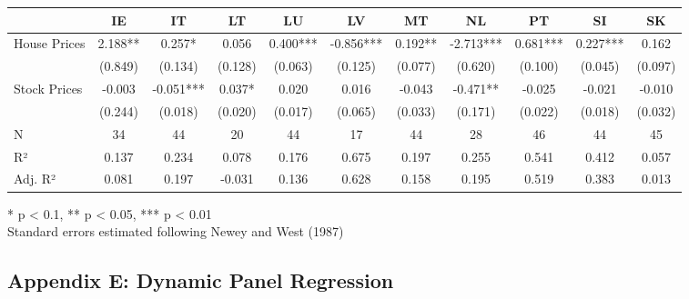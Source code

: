 \documentclass[
  a4paper,
  DIV=11,
  numbers=noendperiod]{scrartcl}
\begin{document}
\begin{landscape}
\begin{table}[h]
\fontsize{7.5pt}{9.0pt}\selectfont
\begin{tabular*}{\linewidth}{@{\extracolsep{\fill}}lcccccccccc}
\toprule
  & IE & IT & LT & LU & LV & MT & NL & PT & SI & SK \\ 
\midrule\addlinespace[2.5pt]
House Prices & 2.188** & 0.257* & 0.056 & 0.400*** & -0.856*** & 0.192** & -2.713*** & 0.681*** & 0.227*** & 0.162 \\ 
 & (0.849) & (0.134) & (0.128) & (0.063) & (0.125) & (0.077) & (0.620) & (0.100) & (0.045) & (0.097) \\ 
Stock Prices & -0.003 & -0.051*** & 0.037* & 0.020 & 0.016 & -0.043 & -0.471** & -0.025 & -0.021 & -0.010 \\ 
{} & {(0.244)} & {(0.018)} & {(0.020)} & {(0.017)} & {(0.065)} & {(0.033)} & {(0.171)} & {(0.022)} & {(0.018)} & {(0.032)} \\ 
N & 34 & 44 & 20 & 44 & 17 & 44 & 28 & 46 & 44 & 45 \\ 
R² & 0.137 & 0.234 & 0.078 & 0.176 & 0.675 & 0.197 & 0.255 & 0.541 & 0.412 & 0.057 \\ 
Adj. R² & 0.081 & 0.197 & -0.031 & 0.136 & 0.628 & 0.158 & 0.195 & 0.519 & 0.383 & 0.013 \\ 
\bottomrule
\end{tabular*}
\begin{minipage}{\linewidth}
* p < 0.1, ** p < 0.05, *** p < 0.01\\
Standard errors estimated following Newey and West (1987)\\
\end{minipage}
\end{table}




\end{landscape}

\newpage{}

\subsection*{Appendix E: Dynamic Panel
Regression}\label{appendix-e-dynamic-panel-regression}
\end{document}
